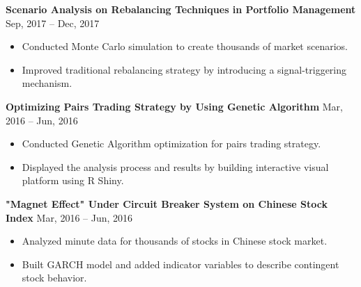 \documentclass[a4paper,12pt]{report}
\newcommand{\marginAdj}{0.5in}
\begin{document}
\noindent
\textbf{Scenario Analysis on Rebalancing Techniques in Portfolio Management }  \hspace*{\marginAdj}  \hspace*{0.05in} {\fontsize{12pt}{12pt}\selectfont Sep, 2017 – Dec, 2017} \par
\noindent 
\begin{itemize}[noitemsep,topsep=0pt]
	\item {\fontsize{12pt}{12pt}\selectfont Conducted Monte Carlo simulation to create thousands of market scenarios.} \par
	\item {\fontsize{12pt}{12pt}\selectfont Improved traditional rebalancing strategy by introducing a signal-triggering mechanism.} \par
\end{itemize}


\noindent 
\textbf{Optimizing Pairs Trading Strategy by Using Genetic Algorithm} \hspace*{0.65in}  \hspace*{\marginAdj} {\fontsize{12pt}{12pt}\selectfont  Mar, 2016 – Jun, 2016} \par
\noindent 
\begin{itemize}[noitemsep,topsep=0pt]
\item {\fontsize{12pt}{12pt}\selectfont Conducted Genetic Algorithm optimization for pairs trading strategy.}
\item {\fontsize{12pt}{12pt}\selectfont Displayed the analysis process and results by building interactive visual platform using R Shiny.}
\end{itemize}

\noindent 
\textbf{"Magnet Effect" Under Circuit Breaker System on Chinese Stock Index} \hspace*{0.10in}\hspace*{\marginAdj} {\fontsize{12pt}{12pt}\selectfont Mar, 2016 – Jun, 2016} \par
\noindent 
\begin{itemize}[noitemsep,topsep=0pt]
	\item {\fontsize{12pt}{12pt}\selectfont Analyzed minute data for thousands of stocks in Chinese stock market.} \par
	\item {\fontsize{12pt}{12pt}\selectfont Built GARCH model and added indicator variables to describe contingent stock behavior.} \par
\end{itemize}
\end{document}
